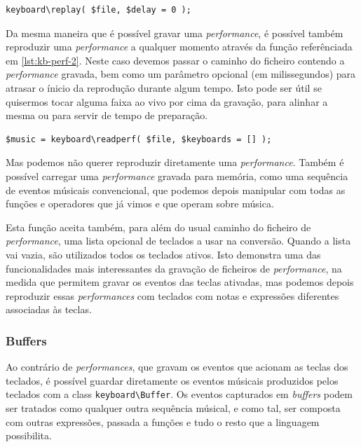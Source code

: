 \begin{lstlisting}[caption={Reprodução de uma \textit{performance}},label={lst:kb-perf-2}]
keyboard\replay( $file, $delay = 0 );
\end{lstlisting}

Da mesma maneira que é possível gravar uma \textit{performance}, é possível também reproduzir uma \textit{performance} a qualquer momento através da função referênciada em \ref{lst:kb-perf-2}. Neste caso devemos passar o caminho do ficheiro contendo a \textit{performance} gravada, bem como um parâmetro opcional (em milissegundos) para atrasar o ínicio da reprodução durante algum tempo. Isto pode ser útil se quisermos tocar alguma faixa ao vivo por cima da gravação, para alinhar a mesma ou para servir de tempo de preparação.

\begin{lstlisting}[caption={Conversão de uma \textit{performance} numa sequência de eventos músicais},label={lst:kb-perf-3}]
$music = keyboard\readperf( $file, $keyboards = [] );
\end{lstlisting}

Mas podemos não querer reproduzir diretamente uma \textit{performance}. Também é possível carregar uma \textit{performance} gravada para memória, como uma sequência de eventos músicais convencional, que podemos depois manipular com todas as funções e operadores que já vimos e que operam sobre música.

Esta função aceita também, para além do usual caminho do ficheiro de \textit{performance}, uma lista opcional de teclados a usar na conversão. Quando a lista vai vazia, são utilizados todos os teclados ativos. Isto demonstra uma das funcionalidades mais interessantes da gravação de ficheiros de \textit{performance}, na medida que permitem gravar os eventos das teclas ativadas, mas podemos depois reproduzir essas \textit{performances} com teclados com notas e expressões diferentes associadas às teclas.



\subsubsection{Buffers}
Ao contrário de \textit{performances}, que gravam os eventos que acionam as teclas dos teclados, é possível guardar diretamente os eventos músicais produzidos pelos teclados com a class \texttt{keyboard\textbackslash{}Buffer}. Os eventos capturados em \textit{buffers} podem ser tratados como qualquer outra sequência músical, e como tal, ser composta com outras expressões, passada a funções e tudo o resto que a linguagem possibilita. 

